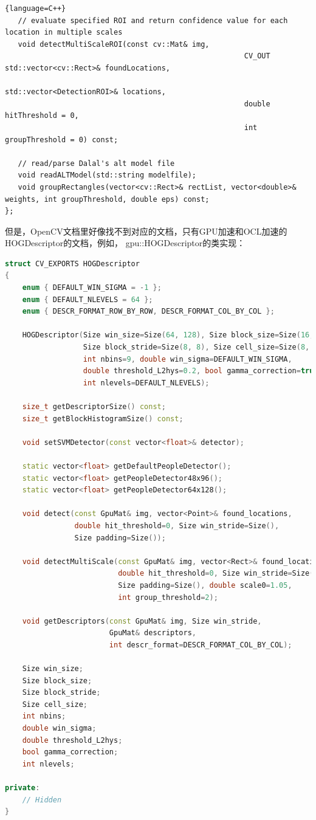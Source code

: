 \documentclass[10pt,technote,onecolumn,twoside]{IEEEtran}
\begin{document}
\begin{lstlisting}{language=C++}
   // evaluate specified ROI and return confidence value for each location in multiple scales
   void detectMultiScaleROI(const cv::Mat& img,
                                                       CV_OUT std::vector<cv::Rect>& foundLocations,
                                                       std::vector<DetectionROI>& locations,
                                                       double hitThreshold = 0,
                                                       int groupThreshold = 0) const;

   // read/parse Dalal's alt model file
   void readALTModel(std::string modelfile);
   void groupRectangles(vector<cv::Rect>& rectList, vector<double>& weights, int groupThreshold, double eps) const;
};
\end{lstlisting}

但是，OpenCV文档里好像找不到对应的文档，只有GPU加速和OCL加速的\textsf{HOGDescriptor}的文档，例如，
\textsf{gpu::HOGDescriptor}的类实现：
\begin{lstlisting}[language=C++]
struct CV_EXPORTS HOGDescriptor
{
    enum { DEFAULT_WIN_SIGMA = -1 };
    enum { DEFAULT_NLEVELS = 64 };
    enum { DESCR_FORMAT_ROW_BY_ROW, DESCR_FORMAT_COL_BY_COL };

    HOGDescriptor(Size win_size=Size(64, 128), Size block_size=Size(16, 16),
                  Size block_stride=Size(8, 8), Size cell_size=Size(8, 8),
                  int nbins=9, double win_sigma=DEFAULT_WIN_SIGMA,
                  double threshold_L2hys=0.2, bool gamma_correction=true,
                  int nlevels=DEFAULT_NLEVELS);

    size_t getDescriptorSize() const;
    size_t getBlockHistogramSize() const;

    void setSVMDetector(const vector<float>& detector);

    static vector<float> getDefaultPeopleDetector();
    static vector<float> getPeopleDetector48x96();
    static vector<float> getPeopleDetector64x128();

    void detect(const GpuMat& img, vector<Point>& found_locations,
                double hit_threshold=0, Size win_stride=Size(),
                Size padding=Size());

    void detectMultiScale(const GpuMat& img, vector<Rect>& found_locations,
                          double hit_threshold=0, Size win_stride=Size(),
                          Size padding=Size(), double scale0=1.05,
                          int group_threshold=2);

    void getDescriptors(const GpuMat& img, Size win_stride,
                        GpuMat& descriptors,
                        int descr_format=DESCR_FORMAT_COL_BY_COL);

    Size win_size;
    Size block_size;
    Size block_stride;
    Size cell_size;
    int nbins;
    double win_sigma;
    double threshold_L2hys;
    bool gamma_correction;
    int nlevels;

private:
    // Hidden
}
\end{lstlisting}
\end{document}
